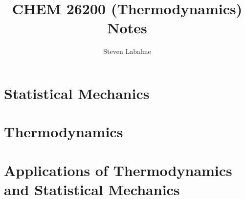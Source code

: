 \documentclass{report}
\title{CHEM 26200 (Thermodynamics) Notes}
\author{Steven Labalme}
\renewcommand{\chaptername}{Week}
\begin{document}
\maketitle



\tableofcontents
\listoffigures
\listoftables
\newpage



\pagestyle{main}
\renewcommand{\chaptermark}[1]{\markboth{\chaptername\ \thechapter\ (#1)}{}}
\part{Statistical Mechanics}




\part{Thermodynamics}






\part{Applications of Thermodynamics and Statistical Mechanics}








\printbibliography[heading=bibintoc]
\end{document}

